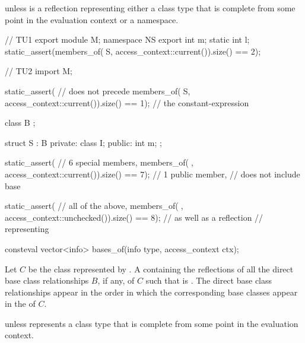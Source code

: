 \begin{itemdescr}
\pnum
\throws
{} unless
 is a reflection representing either
a class type that is complete from some point in the evaluation context
or a namespace.

\pnum
\begin{example}
\begin{codeblock}
// TU1
export module M;
namespace NS {
  export int m;
  static int l;
}
static_assert(members_of(^^NS, access_context::current()).size() == 2);

// TU2
import M;

static_assert(                                                  //  does not precede
  members_of(^^NS, access_context::current()).size() == 1);     // the constant-expression

class B {};

struct S : B {
private:
  class I;
public:
  int m;
};

static_assert(                                                  // 6 special members,
  members_of(^^S, access_context::current()).size() == 7);      // 1 public member,
                                                                // does not include base

static_assert(                                                  // all of the above,
  members_of(^^S, access_context::unchecked()).size() == 8);    // as well as a reflection
                                                                // representing 
\end{codeblock}
\end{example}
\end{itemdescr}

%
\begin{itemdecl}
consteval vector<info> bases_of(info type, access_context ctx);
\end{itemdecl}

\begin{itemdescr}
\pnum
\returns
Let $C$ be the class represented by .
A  containing the reflections
of all the direct base class relationships $B$, if any,
of $C$ such that  is .
The direct base class relationships appear in the order in which
the corresponding base classes appear in the  of $C$.

\pnum
\throws
{} unless
 represents a class type
that is complete from some point in the evaluation context.
\end{itemdescr}

